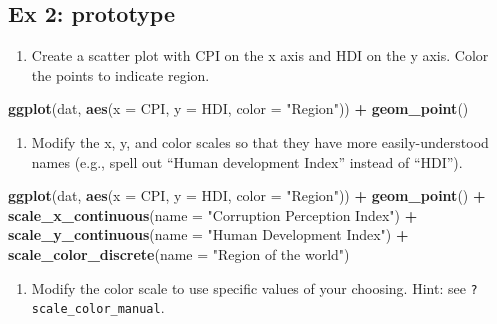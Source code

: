 \documentclass[]{book}
\newenvironment{Shaded}{\begin{snugshade}}{\end{snugshade}}
\newcommand{\KeywordTok}[1]{\textcolor[rgb]{0.13,0.29,0.53}{\textbf{#1}}}
\newcommand{\DataTypeTok}[1]{\textcolor[rgb]{0.13,0.29,0.53}{#1}}
\newcommand{\StringTok}[1]{\textcolor[rgb]{0.31,0.60,0.02}{#1}}
\newcommand{\OperatorTok}[1]{\textcolor[rgb]{0.81,0.36,0.00}{\textbf{#1}}}
\newcommand{\NormalTok}[1]{#1}
\providecommand{\tightlist}{%
  \setlength{\itemsep}{0pt}\setlength{\parskip}{0pt}}
\begin{document}
\subsection{Ex 2: prototype}\label{ex-2-prototype-2}

\begin{enumerate}
\def\labelenumi{\arabic{enumi}.}
\tightlist
\item
  Create a scatter plot with CPI on the x axis and HDI on the y axis.
  Color the points to indicate region.
\end{enumerate}

\begin{Shaded}
\begin{Highlighting}[]
\KeywordTok{ggplot}\NormalTok{(dat, }\KeywordTok{aes}\NormalTok{(}\DataTypeTok{x =}\NormalTok{ CPI, }\DataTypeTok{y =}\NormalTok{ HDI, }\DataTypeTok{color =} \StringTok{"Region"}\NormalTok{)) }\OperatorTok{+}
\StringTok{  }\KeywordTok{geom_point}\NormalTok{()}
\end{Highlighting}
\end{Shaded}

\begin{enumerate}
\def\labelenumi{\arabic{enumi}.}
\setcounter{enumi}{1}
\tightlist
\item
  Modify the x, y, and color scales so that they have more
  easily-understood names (e.g., spell out ``Human development Index''
  instead of ``HDI'').
\end{enumerate}

\begin{Shaded}
\begin{Highlighting}[]
\KeywordTok{ggplot}\NormalTok{(dat, }\KeywordTok{aes}\NormalTok{(}\DataTypeTok{x =}\NormalTok{ CPI, }\DataTypeTok{y =}\NormalTok{ HDI, }\DataTypeTok{color =} \StringTok{"Region"}\NormalTok{)) }\OperatorTok{+}
\KeywordTok{geom_point}\NormalTok{() }\OperatorTok{+}
\KeywordTok{scale_x_continuous}\NormalTok{(}\DataTypeTok{name =} \StringTok{"Corruption Perception Index"}\NormalTok{) }\OperatorTok{+}
\KeywordTok{scale_y_continuous}\NormalTok{(}\DataTypeTok{name =} \StringTok{"Human Development Index"}\NormalTok{) }\OperatorTok{+}
\KeywordTok{scale_color_discrete}\NormalTok{(}\DataTypeTok{name =} \StringTok{"Region of the world"}\NormalTok{)}
\end{Highlighting}
\end{Shaded}

\begin{enumerate}
\def\labelenumi{\arabic{enumi}.}
\setcounter{enumi}{2}
\tightlist
\item
  Modify the color scale to use specific values of your choosing. Hint:
  see \texttt{?scale\_color\_manual}.
\end{enumerate}
\end{document}
